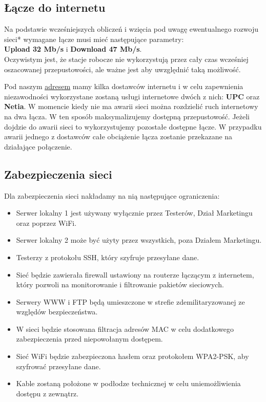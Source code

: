 \documentclass[a4paper,12pt]{extarticle}  %
\begin{document}
\subsection{Łącze do internetu}

Na podstawie wcześniejszych obliczeń i wzięcia pod uwagę
ewentualnego rozwoju sieci* wymagane łącze musi mieć
następujące parametry:\\

\textbf{Upload 32 Mb/s} i \textbf{Download 47 Mb/s}.\\

Oczywistym jest, że stacje robocze nie wykorzystują przez
cały czas wcześniej oszacowanej przepustowości,
ale ważne jest aby uwzględnić taką możliwość.

Pod naszym \underline{\href{address}{adresem}} mamy kilka dostawców internetu i
w celu zapewnienia niezawodności wykorzystane zostaną
usługi internetowe dwóch z nich:
\textbf{UPC} oraz \textbf{Netia}.
W momencie kiedy nie ma awarii sieci można rozdzielić
ruch internetowy na dwa łącza.  W ten sposób maksymalizujemy
dostępną przepustowość. Jeżeli dojdzie do awarii sieci to
wykorzystujemy pozostałe dostępne łącze. W przypadku awarii jednego z dostawców całe obciążenie łącza
zostanie przekazane na działające połączenie.
\subsection{Zabezpieczenia sieci}
Dla zabezpieczenia sieci nakładamy na nią następujące ograniczenia:
\begin{itemize}
	\item Serwer lokalny 1 jest używany wyłącznie przez Testerów, Dział Marketingu oraz poprzez WiFi.
	\item Serwer lokalny 2 może być użyty przez wszystkich, poza Działem Marketingu.
	\item Testerzy z protokołu SSH, który szyfruje przesyłane dane.
	\item Sieć będzie zawierała firewall ustawiony na routerze łączącym z internetem, który pozwoli na monitorowanie i filtrowanie pakietów sieciowych.
	\item Serwery WWW i FTP będą umieszczone w strefie zdemilitaryzowanej ze względów bezpieczeństwa.
	\item W sieci będzie stosowana filtracja adresów MAC w celu dodatkowego zabezpieczenia przed niepowołanym dostępem.
	\item Sieć WiFi będzie zabezpieczona hasłem oraz protokołem WPA2-PSK, aby szyfrować przesyłane dane.
	\item Kable zostaną położone w podłodze technicznej w celu uniemożliwienia dostępu z zewnątrz.
\end{itemize}
\end{document}
